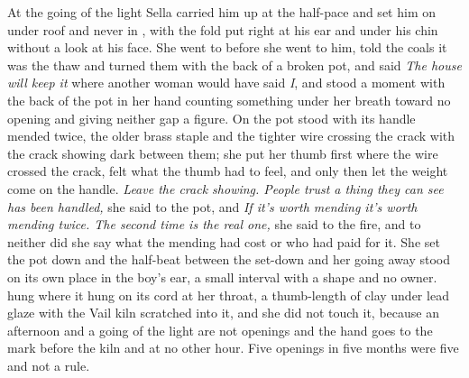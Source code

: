 At the going of the light Sella carried him up at the half-pace and set him on  under  roof and never in , with the fold put right at his ear and under his chin without a look at his face. She went to  before she went to him, told the coals it was the thaw and turned them with the back of a broken pot, and said \emph{The house will keep it} where another woman would have said \emph{I}, and stood a moment with the back of the pot in her hand counting something under her breath toward no opening and giving neither gap a figure. On  the pot stood with its handle mended twice, the older brass staple and the tighter wire crossing the crack with the crack showing dark between them; she put her thumb first where the wire crossed the crack, felt what the thumb had to feel, and only then let the weight come on the handle. \emph{Leave the crack showing. People trust a thing they can see has been handled,} she said to the pot, and \emph{If it's worth mending it's worth mending twice. The second time is the real one,} she said to the fire, and to neither did she say what the mending had cost or who had paid for it. She set the pot down and the half-beat between the set-down and her going away stood on its own place in the boy's ear, a small interval with a shape and no owner.  hung where it hung on its cord at her throat, a thumb-length of clay under lead glaze with the Vail kiln scratched into it, and she did not touch it, because an afternoon and a going of the light are not openings and the hand goes to the mark before the kiln and at no other hour. Five openings in five months were five and not a rule.

